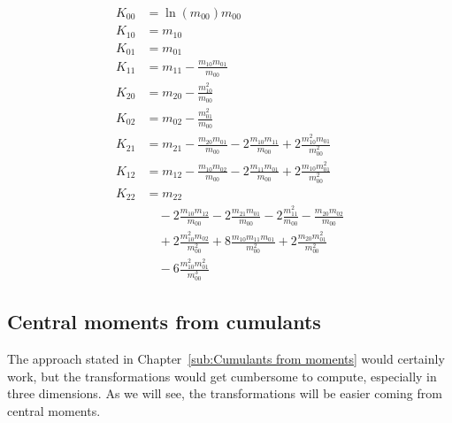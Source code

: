 \begin{align}
  K_{00} & = \ln(m_{00})m_{00} \label{eq: K 00 from moments}\\
  K_{10} & = m_{10} \label{eq: K 10 from moments}\\
  K_{01} & = m_{01} \label{eq: K 01 from moments}\\
  K_{11} & = m_{11} - \frac{m_{10}m_{01}}{m_{00}} \label{eq: K 11 from moments} \\
  K_{20} & = m_{20} - \frac{m_{10}^2}{m_{00}} \label{eq: K 20 from moments}\\
  K_{02} & = m_{02} - \frac{m_{01}^2}{m_{00}} \label{eq: K 02 from moments}\\
  K_{21} & = m_{21} - \frac{m_{20}m_{01}}{m_{00}}
       - 2\frac{m_{10}m_{11}}{m_{00}} + 2\frac{m_{10}^2 m_{01}}{m_{00}^2} \label{eq: K 21 from moments}\\
  K_{12} & = m_{12} - \frac{m_{10}m_{02}}{m_{00}}
       - 2\frac{m_{11}m_{01}}{m_{00}} + 2\frac{m_{10} m_{01}^2}{m_{00}^2} \label{eq: K 12 from moments}\\
  K_{22} & = m_{22} \\
       & \quad - 2 \frac{m_{10}m_{12}}{m_{00}} - 2\frac{m_{21}m_{01}}{m_{00}}
        - 2 \frac{m_{11}^2}{m_{00}} - \frac{m_{20}m_{02}}{m_{00}} \\
       & \quad + 2 \frac{m_{10}^2 m_{02}}{m_{00}^2} + 8 \frac{m_{10}m_{11}m_{01}}{m_{00}^2}
        + 2 \frac{m_{20}m_{01}^2}{m_{00}^2} \\
       & \quad - 6 \frac{m_{10}^2 m_{01}^2}{m_{00}^3}\label{eq: K 22 from moments}
\end{align}

\subsection{Central moments from cumulants}
\label{sub:Central moments from cumulants}
The approach stated in Chapter~\ref{sub:Cumulants from moments} would certainly work, but the transformations would get cumbersome to compute, especially in three dimensions. As we will see, the transformations will be easier coming from central moments.

